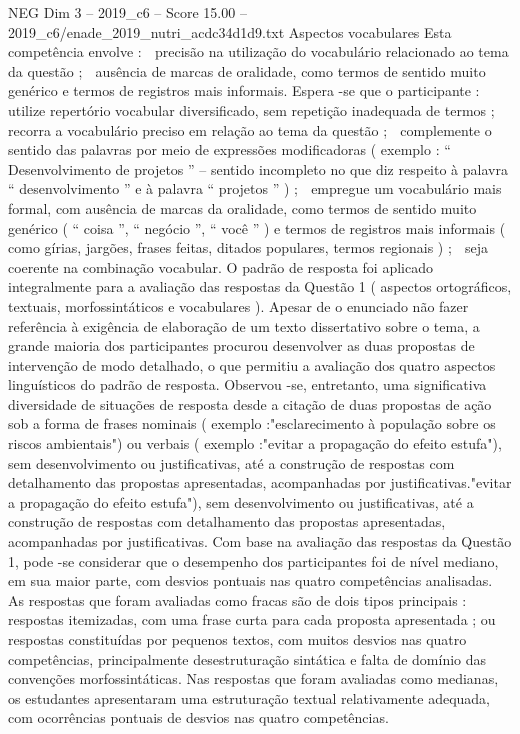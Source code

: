\begin{textsample}{NEG Dim 3 – 2019\_c6 – Score 15.00 – 2019\_c6/enade\_2019\_nutri\_acdc34d1d9.txt}
Aspectos vocabulares Esta competência envolve :  precisão na utilização do vocabulário relacionado ao tema da questão ;  ausência de marcas de oralidade, como termos de sentido muito genérico e termos de registros mais informais.
Espera -se que o participante :  utilize repertório vocabular diversificado, sem repetição inadequada de termos ;  recorra a vocabulário preciso em relação ao tema da questão ;  complemente o sentido das palavras por meio de expressões modificadoras ( exemplo : “ Desenvolvimento de projetos ” – sentido incompleto no que diz respeito à palavra “ desenvolvimento ” e à palavra “ projetos ” ) ;  empregue um vocabulário mais formal, com ausência de marcas da oralidade, como termos de sentido muito genérico ( “ coisa ”, “ negócio ”, “ você ” ) e termos de registros mais informais ( como gírias, jargões, frases feitas, ditados populares, termos regionais ) ;  seja coerente na combinação vocabular.
O padrão de resposta foi aplicado integralmente para a avaliação das respostas da Questão 1 ( aspectos ortográficos, textuais, morfossintáticos e vocabulares ).
Apesar de o enunciado não fazer referência à exigência de elaboração de um texto dissertativo sobre o tema, a grande maioria dos participantes procurou desenvolver as duas propostas de intervenção de modo detalhado, o que permitiu a avaliação dos quatro aspectos linguísticos do padrão de resposta.
Observou -se, entretanto, uma significativa diversidade de situações de resposta desde a citação de duas propostas de ação sob a forma de frases nominais ( exemplo :"esclarecimento à população sobre os riscos ambientais") ou verbais ( exemplo :"evitar a propagação do efeito estufa"), sem desenvolvimento ou justificativas, até a construção de respostas com detalhamento das propostas apresentadas, acompanhadas por justificativas."evitar a propagação do efeito estufa"), sem desenvolvimento ou justificativas, até a construção de respostas com detalhamento das propostas apresentadas, acompanhadas por justificativas.
Com base na avaliação das respostas da Questão 1, pode -se considerar que o desempenho dos participantes foi de nível mediano, em sua maior parte, com desvios pontuais nas quatro competências analisadas.
As respostas que foram avaliadas como fracas são de dois tipos principais : respostas itemizadas, com uma frase curta para cada proposta apresentada ; ou respostas constituídas por pequenos textos, com muitos desvios nas quatro competências, principalmente desestruturação sintática e falta de domínio das convenções morfossintáticas.
Nas respostas que foram avaliadas como medianas, os estudantes apresentaram uma estruturação textual relativamente adequada, com ocorrências pontuais de desvios nas quatro competências.

\end{textsample}
